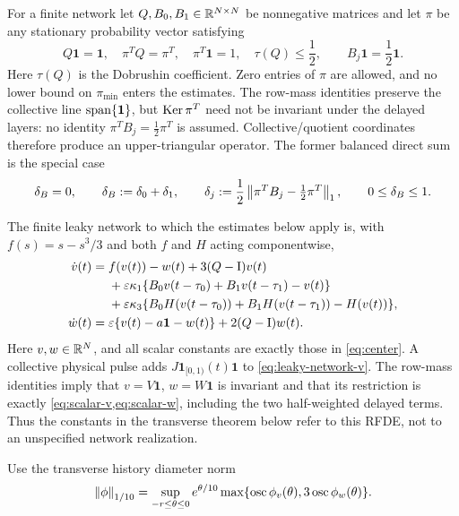 For a finite network let \(Q,B_0,B_1\in\mathbb R^{N\times N}\) be nonnegative
matrices and let \(\pi\) be any stationary probability vector satisfying
\begin{equation}
 Q\mathbf1=\mathbf1,\quad \pi^TQ=\pi^T,\quad
 \pi^T\mathbf1=1,\quad
 \tau(Q)\le\frac12,\qquad
 B_j\mathbf1=\frac12\mathbf1.                           \label{eq:row-mass-network}
\end{equation}
Here \(\tau(Q)\) is the Dobrushin coefficient.  Zero entries of \(\pi\)
are allowed, and no lower bound on \(\pi_{\min}\) enters the estimates.
The row-mass identities preserve the collective line
\(\operatorname{span}\{\mathbf1\}\), but \(\operatorname{Ker}\pi^T\) need not be invariant under the
delayed layers: no identity \(\pi^TB_j=\frac12\pi^T\) is assumed.
Collective/quotient coordinates therefore produce an upper-triangular
operator.  The former balanced direct sum is the special case
\[
 \delta_B=0,\qquad
 \delta_B:=\delta_0+\delta_1,\qquad
 \delta_j:=\frac12\left\lVert\pi^TB_j-\tfrac12\pi^T\right\rVert_1,
 \qquad 0\le\delta_B\le1.
\]

The finite leaky network to which the estimates below apply is, with
\(f(s)=s-s^3/3\) and both \(f\) and \(H\) acting componentwise,
\begin{align}
 \dot v(t)={}&f(v(t))-w(t)+3(Q-\mathrm I)v(t)\notag\\
 &+\varepsilon\kappa_1\{B_0v(t-\tau_0)+B_1v(t-\tau_1)-v(t)\}\notag\\
 &+\varepsilon\kappa_3\{B_0H(v(t-\tau_0))+B_1H(v(t-\tau_1))-H(v(t))\},
                                                               \label{eq:leaky-network-v}\\
 \dot w(t)={}&\varepsilon\{v(t)-a\mathbf1-w(t)\}+2(Q-\mathrm I)w(t).
                                                               \label{eq:leaky-network-w}
\end{align}
Here \(v,w\in\mathbb R^N\), and all scalar constants are exactly those in
\cref{eq:center}.  A collective physical pulse adds
\(J\mathbf1_{[0,1)}(t)\mathbf1\) to
\cref{eq:leaky-network-v}.  The row-mass identities imply that
\(v=V\mathbf1\), \(w=W\mathbf1\) is invariant and that its restriction is
exactly \cref{eq:scalar-v,eq:scalar-w}, including the two half-weighted
delayed terms.  Thus the constants in the transverse theorem below refer to
this RFDE, not to an unspecified network realization.

Use the transverse history diameter norm
\begin{equation}
 \left\lVert\phi\right\rVert_{1/10}
 =\sup_{-r\le\theta\le0}e^{\theta/10}
   \max\{\operatorname{osc}\phi_v(\theta),3\operatorname{osc}\phi_w(\theta)\}.      \label{eq:diameter-norm}
\end{equation}

